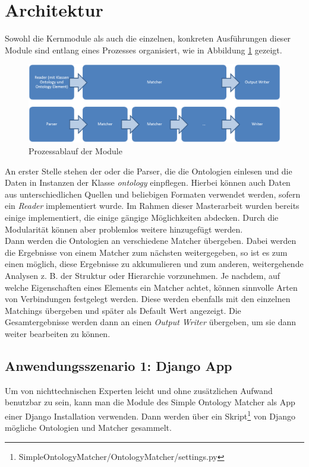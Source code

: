 		\section{Architektur}
		Sowohl die Kernmodule als auch die einzelnen, konkreten Ausführungen dieser
		Module sind entlang eines Prozesses organisiert, wie in Abbildung \ref{fig2}
		gezeigt.
		\begin{figure}[h!]
		\centering
		\includegraphics[width=1.0\textwidth]{pics/Module-overview.png}
		\caption{Prozessablauf der Module}
		\label{fig2}
		\end{figure}
		An erster Stelle stehen der oder die Parser, die die Ontologien einlesen und
		die Daten in Instanzen der Klasse \textit{ontology} einpflegen. Hierbei können
		auch Daten aus unterschiedlichen Quellen und beliebigen Formaten verwendet
		werden, sofern ein \textit{Reader} implementiert wurde. Im Rahmen dieser
		Masterarbeit wurden bereits einige implementiert, die einige gängige
		Möglichkeiten abdecken. Durch die Modularität können aber problemlos weitere
		hinzugefügt werden.\\
		Dann werden die Ontologien an verschiedene Matcher übergeben. Dabei werden
		die Ergebnisse von einem Matcher zum nächsten weitergegeben, so ist es zum
		einen möglich, diese Ergebnisse zu akkumulieren und zum
		anderen, weitergehende Analysen z. B. der Struktur oder Hierarchie vorzunehmen. Je nachdem, auf welche Eigenschaften
		eines Elements ein Matcher achtet, können sinnvolle Arten von Verbindungen
		festgelegt werden. Diese werden ebenfalls mit den einzelnen Matchings
		übergeben und später als Default Wert angezeigt. Die Gesamtergebnisse werden
		dann an einen \textit{Output Writer} übergeben, um sie dann weiter bearbeiten zu können.\\
		
		\cleardoublepage
		\pagebreak[4]
		
		\subsection{Anwendungsszenario 1: Django App}
		Um von nichttechnischen Experten leicht und ohne zusätzlichen Aufwand
		benutzbar zu sein, kann man die Module des Simple Ontology Matcher als App
		einer Django Installation verwenden. Dann werden über ein
		Skript\footnote{SimpleOntologyMatcher/OntologyMatcher/settings.py} von Django
		mögliche Ontologien und Matcher gesammelt.
		
